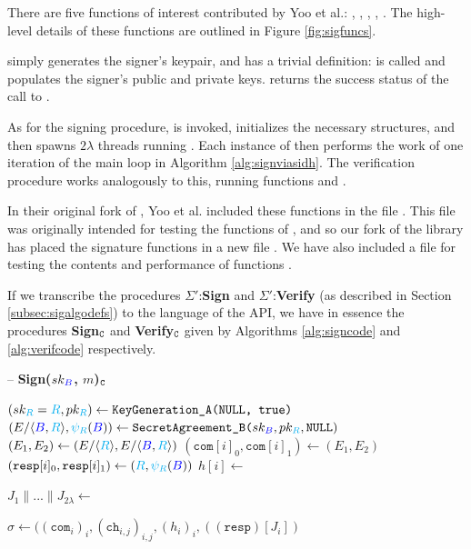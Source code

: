 There are five functions of interest contributed by Yoo et al.: , , , , . The high-level details of these functions are outlined in Figure \ref{fig:sigfuncs}.

 simply generates the signer's keypair, and has a trivial definition:  is called and populates the signer's public and private keys.  returns the success status of the call to .

As for the signing procedure,  is invoked, initializes the necessary structures, and then spawns $2\lambda$ threads running . Each instance of  then performs the work of one iteration of the main loop in Algorithm \ref{alg:signviasidh}. The verification procedure works analogously to this, running functions  and .

In their original fork of \sidh, Yoo et al. included these functions in the file . This file was originally intended for testing the functions of , and so our fork of the library has placed the signature functions in a new file . We have also included a file  for testing the contents and performance of  functions \cite{yoosigcode}.

If we transcribe the procedures $\Sigma'$:\textbf{Sign} and $\Sigma'$:\textbf{Verify} (as described in Section \ref{subsec:sigalgodefs}) to the language of the \sidh API, we have in essence the procedures \textbf{Sign}$_{\texttt{C}}$ and \textbf{Verify}$_{\texttt{C}}$ given by Algorithms \ref{alg:signcode} and \ref{alg:verifcode} respectively.\\

\begin{algorithm}
\caption{-- \textbf{Sign($sk_{\textcolor{blue}{B}}$, $m$)}$_{\texttt{C}}$}\label{alg:signcode}
\begin{algorithmic}[1]
	\State $(sk_{\textcolor{cyan}{R}} = \textcolor{cyan}{R}, pk_{\textcolor{cyan}{R}}) \gets \texttt{KeyGeneration\_A(\texttt{NULL}, \texttt{true})}$
	\State $(E/\langle \textcolor{blue}{B},\textcolor{cyan}{R} \rangle, \textcolor{cyan}{\psi_R}(\textcolor{blue}{B})) \gets \texttt{SecretAgreement\_B(}sk_{\textcolor{blue}{B}}, pk_{\textcolor{cyan}{R}}, \texttt{NULL})$
	\State $(E_{1},E_{2}) \gets (E/\langle \textcolor{cyan}{R} \rangle, E/\langle \textcolor{blue}{B},\textcolor{cyan}{R} \rangle)$
	\State $(\texttt{com}[i]_{0}, \texttt{com}[i]_{1}) \gets (E_{1}, E_{2})$
	\State $(\texttt{resp}[i]_{0}, \texttt{resp}[i]_{1}) \gets (\textcolor{cyan}{R}, \textcolor{cyan}{\psi_R}(\textcolor{blue}{B}))$
	\State $h[i] \gets$ 
\EndFor

\State $J_{1} \parallel ... \parallel J_{2\lambda} \gets$ 

\State \Return $\sigma \gets ((\texttt{com}_{i})_{i}, (\texttt{ch}_{i,j})_{i,j}, (h_{i})_{i}, ((\texttt{resp})[J_{i}])$
\end{algorithmic}
\end{algorithm}

